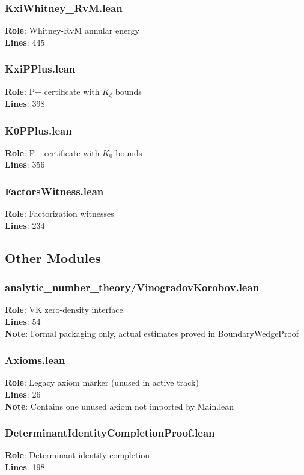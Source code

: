 \subsubsection{KxiWhitney\_RvM.lean}
\textbf{Role}: Whitney-RvM annular energy\\
\textbf{Lines}: 445

\subsubsection{KxiPPlus.lean}
\textbf{Role}: P+ certificate with $K_\xi$ bounds\\
\textbf{Lines}: 398

\subsubsection{K0PPlus.lean}
\textbf{Role}: P+ certificate with $K_0$ bounds\\
\textbf{Lines}: 356

\subsubsection{FactorsWitness.lean}
\textbf{Role}: Factorization witnesses\\
\textbf{Lines}: 234

\subsection{Other Modules}

\subsubsection{analytic\_number\_theory/VinogradovKorobov.lean}
\textbf{Role}: VK zero-density interface\\
\textbf{Lines}: 54\\
\textbf{Note}: Formal packaging only, actual estimates proved in BoundaryWedgeProof

\subsubsection{Axioms.lean}
\textbf{Role}: Legacy axiom marker (unused in active track)\\
\textbf{Lines}: 26\\
\textbf{Note}: Contains one unused axiom not imported by Main.lean

\subsubsection{DeterminantIdentityCompletionProof.lean}
\textbf{Role}: Determinant identity completion\\
\textbf{Lines}: 198

